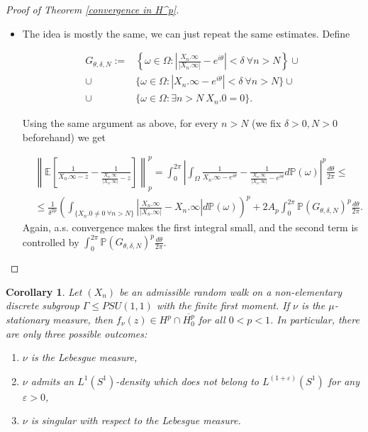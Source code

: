 \documentclass[11pt]{article}
\newtheorem{corollary}{Corollary}[section]
\begin{document}
\begin{proof}[Proof of Theorem \ref{convergence in H^p}]
\begin{itemize}
\[\begin{aligned}
			&= \frac{1}{2^p\delta^{2p}} \left( \int_{ \{ X_n.0 \ne 0 \ \forall n > N \} } |X_\infty.\infty - X_n.\infty| d \mathbb{P}(\omega) \right)^p + 2A_p \int_{0}^{2 \pi} \mathbb{P}( E_{\theta, \delta, N})^p \frac{d \theta}{2 \pi}.
		\end{aligned}
		\]
		First of all, we choose such $\delta> 0$ and $N \in \mathbb{N}$ so that $\int_{0}^{2 \pi} \mathbb{P}( E_{\theta, \delta, N})^p \frac{d \theta}{2 \pi}$ is small enough, then we increase $n$ until the first integral becomes small due to DCT.
		\item The idea is mostly the same, we can just repeat the same estimates. Define
		
		\[
		\begin{aligned}
			G_{\theta, \delta, N} := &\left\lbrace \omega \in \Omega : \left| \frac{X_n.\infty}{|X_n.\infty|} - e^{i \theta} \right| < \delta \ \forall n > N \right\rbrace \cup \\ \cup & \{ \omega \in \Omega : | X_n.\infty - e^{i \theta} | < \delta \ \forall n > N \} \cup \\ \cup & \{\omega \in \Omega : \exists n > N \  X_n.0 = 0 \}.
		\end{aligned}
		\]
		
		Using the same argument as above, for every $n > N$ (we fix $\delta > 0, N > 0$ beforehand) we get
		
		\[
		\begin{aligned}
			& \left\| \mathbb{E} \left[\frac{1}{X_n.\infty - z} - \frac{1}{\frac{X_n.\infty}{|X_n.\infty|} - z}\right] \right\|_p^p = \int_0^{2 \pi} \left| \int_{\Omega} \frac{1}{X_n.\infty - e^{i \theta}} - \frac{1}{\frac{X_n.\infty}{|X_n.\infty|} - e^{i \theta}} d \mathbb{P}(\omega) \right|^p \frac{d \theta}{2 \pi} \le \\ 
			& \le \frac{1}{\delta^{2 p}} \left( \int_{ \{ X_n.0 \ne 0 \ \forall n > N \} } \left|\frac{X_n.\infty}{|X_n.\infty|} - X_n.\infty \right| d \mathbb{P}(\omega) \right)^p + 2 A_p \int_{0}^{2 \pi} \mathbb{P}(G_{\theta, \delta, N})^p \frac{d \theta}{2 \pi}. 
		\end{aligned}
		\]
		Again, a.s. convergence makes the first integral small, and the second term is controlled by $\int_{0}^{2 \pi} \mathbb{P}(G_{\theta, \delta, N})^p \frac{d \theta}{2 \pi}$.
	\end{itemize}
\end{proof}
\begin{corollary}
	Let $(X_n)$ be an admissible random walk on a non-elementary discrete subgroup $\Gamma \leq PSU(1,1)$ with the finite first moment. If $\nu$ is the $\mu$-stationary measure, then $f_\nu(z) \in H^p \cap \overline{H^p_0}$ for all $0 < p < 1$. In particular, there are only three possible outcomes:
	\begin{enumerate}
		\item $\nu$ is the Lebesgue measure,
		\item $\nu$ admits an $L^1(S^1)$-density which does not belong to $L^{(1+\varepsilon)}(S^1)$ for any $\varepsilon > 0$,
		\item $\nu$ is singular with respect to the Lebesgue measure.
	\end{enumerate}
\end{corollary}
\end{document}
